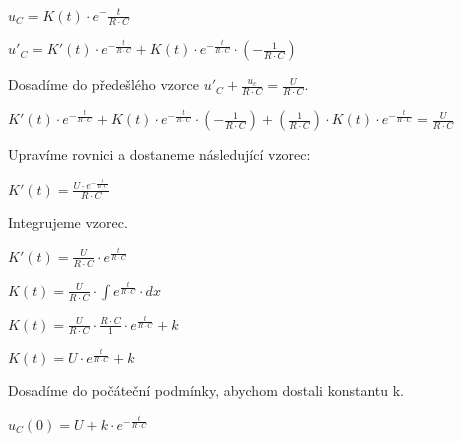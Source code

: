 \vspace{0.5cm}
$u_C = K(t) \cdot e^-\frac{t}{R \cdot C}$

\vspace{0.25cm}
$u'_C = K'(t) \cdot e^{-\frac{t}{R \cdot C}} + K(t) \cdot e^{-\frac{t}{R \cdot C}} \cdot (-\frac{1}{R \cdot C})$

\begin{large}
\vspace{1cm} \flushleft
Dosadíme do předešlého vzorce $u'_C + \frac{u_c}{R \cdot C} = \frac{U}{R \cdot C}$.
\end{large}

\vspace{0.5cm}
$K'(t) \cdot e^{-\frac{t}{R \cdot C}} + K(t) \cdot e^{-\frac{t}{R \cdot C}} \cdot (-\frac{1}{R \cdot C}) + (\frac{1}{R \cdot C}) \cdot K(t) \cdot e^{-\frac{t}{R \cdot C}} = \frac{U}{R \cdot C}$

\begin{large}
\vspace{1cm} \flushleft
Upravíme rovnici a dostaneme následující vzorec:
\end{large}

\vspace{0.5cm}
$K'(t) = \frac{U \cdot e^{-\frac{t}{R \cdot C}}}{R \cdot C}$

\begin{large}
\vspace{1cm} \flushleft
Integrujeme vzorec.
\end{large}

\vspace{0.5cm}
$K'(t) = \frac{U}{R \cdot C} \cdot e^{\frac{t}{R \cdot C}}$

\vspace{0.25cm}
$K(t) = \frac{U}{R \cdot C} \cdot \int e^{\frac{t}{R \cdot C}} \cdot dx$

\vspace{0.25cm}
$K(t) = \frac{U}{R \cdot C} \cdot \frac{R \cdot C}{1} \cdot e^{\frac{t}{R \cdot C}} + k$

\vspace{0.25cm}
$K(t) = U \cdot e^{\frac{t}{R \cdot C}} + k$

\begin{large}
\vspace{1cm} \flushleft
Dosadíme do počáteční podmínky, abychom dostali konstantu k.
\end{large}

\vspace{0.5cm}
$u_C(0) = U + k \cdot e^{-\frac{t}{R \cdot C}}$

